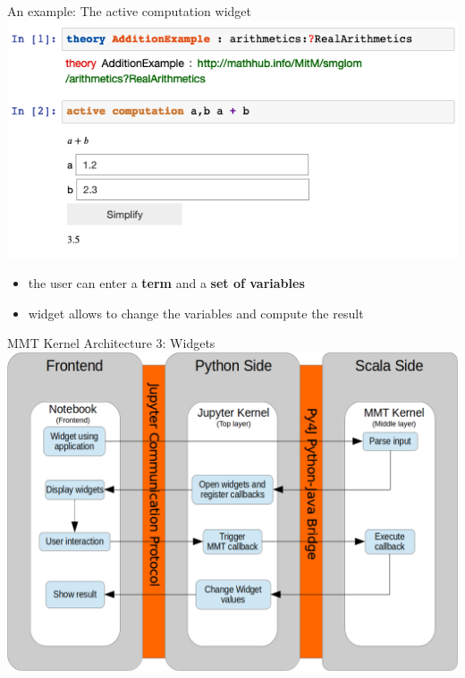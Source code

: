 \documentclass{beamer}
\begin{document}
    \begin{frame}{An example: The active computation widget}
        \includegraphics[scale=.5]{images/activecomp}
        \begin{itemize}
            \item the user can enter a \textbf{term} and a \textbf{set of variables}
            \item widget allows to change the variables and compute the result
        \end{itemize}
    \end{frame}

    \begin{frame}{MMT Kernel Architecture 3: Widgets}
        \centering
        \includegraphics[scale=.35]{images/widgets}
    \end{frame}
\end{document}
